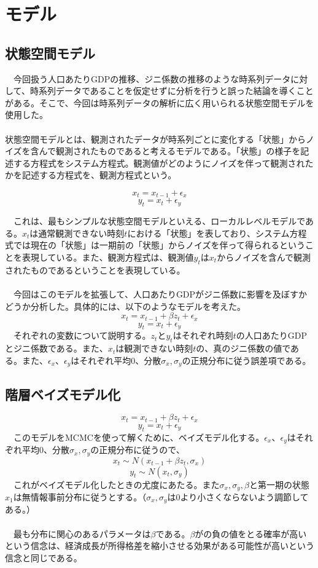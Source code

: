 \documentclass{bxjsarticle}
\begin{document}
\section{モデル}
\subsection{状態空間モデル}
　今回扱う人口あたりGDPの推移、ジニ係数の推移のような時系列データに対して、時系列データであることを仮定せずに分析を行うと誤った結論を導くことがある。そこで、今回は時系列データの解析に広く用いられる状態空間モデルを使用した。\\
 \\
  状態空間モデルとは、観測されたデータが時系列ごとに変化する「状態」からノイズを含んで観測されたものであると考えるモデルである。「状態」の様子を記述する方程式をシステム方程式。観測値がどのようにノイズを伴って観測されたかを記述する方程式を、観測方程式という。

$$x_t = x_{t-1}+\epsilon_x$$
$$y_t = x_{t}+\epsilon_y$$

 　これは、最もシンプルな状態空間モデルといえる、ローカルレベルモデルである。$x_t$は通常観測できない時刻$t$における「状態」を表しており、システム方程式では現在の「状態」は一期前の「状態」からノイズを伴って得られるということを表現している。また、観測方程式は、観測値$y_t$は$x_t$からノイズを含んで観測されたものであるということを表現している。\\
\\
　今回はこのモデルを拡張して、人口あたりGDPがジニ係数に影響を及ぼすかどうか分析した。具体的には、以下のようなモデルを考えた。
$$x_t = x_{t-1}+\beta z_{t}+\epsilon_x$$
$$y_t = x_{t}+\epsilon_y$$
　それぞれの変数について説明する。$z_t$と$y_t$はそれぞれ時刻$t$の人口あたりGDPとジニ係数である。また、$x_t$は観測できない時刻$t$の、真のジニ係数の値である。また、$\epsilon_x$、$\epsilon_y$はそれぞれ平均$0$、分散$\sigma_x,\sigma_y$の正規分布に従う誤差項である。
\subsection{階層ベイズモデル化}
$$x_t = x_{t-1}+\beta z_{t}+\epsilon_x$$
$$y_t = x_{t}+\epsilon_y$$
　このモデルをMCMCを使って解くために、ベイズモデル化する。$\epsilon_x$、$\epsilon_y$はそれぞれ平均$0$、分散$\sigma_x,\sigma_y$の正規分布に従うので、
$$x_t \sim N(x_{t-1}+\beta z_{t},\sigma_x)$$
$$y_t \sim N(x_t,\sigma_y)$$
　これがベイズモデル化したときの尤度にあたる。また$\sigma_x,\sigma_y,\beta$と第一期の状態$x_1$は無情報事前分布に従うとする。（$\sigma_x,\sigma_y$は0より小さくならないよう調節してある。）\\
 \\
 　最も分布に関心のあるパラメータは$\beta$である。$\beta$がの負の値をとる確率が高いという信念は、経済成長が所得格差を縮小させる効果がある可能性が高いという信念と同じである。
\end{document}
